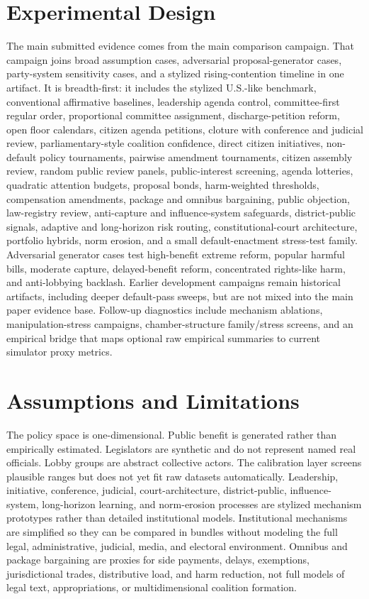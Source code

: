 \documentclass[manuscript,review,anonymous]{acmart}
\begin{document}
\section{Experimental Design}

The main submitted evidence comes from the main comparison campaign. That campaign joins broad assumption cases, adversarial proposal-generator cases, party-system sensitivity cases, and a stylized rising-contention timeline in one artifact. It is breadth-first: it includes the stylized U.S.-like benchmark, conventional affirmative baselines, leadership agenda control, committee-first regular order, proportional committee assignment, discharge-petition reform, open floor calendars, citizen agenda petitions, cloture with conference and judicial review, parliamentary-style coalition confidence, direct citizen initiatives, non-default policy tournaments, pairwise amendment tournaments, citizen assembly review, random public review panels, public-interest screening, agenda lotteries, quadratic attention budgets, proposal bonds, harm-weighted thresholds, compensation amendments, package and omnibus bargaining, public objection, law-registry review, anti-capture and influence-system safeguards, district-public signals, adaptive and long-horizon risk routing, constitutional-court architecture, portfolio hybrids, norm erosion, and a small default-enactment stress-test family. Adversarial generator cases test high-benefit extreme reform, popular harmful bills, moderate capture, delayed-benefit reform, concentrated rights-like harm, and anti-lobbying backlash. Earlier development campaigns remain historical artifacts, including deeper default-pass sweeps, but are not mixed into the main paper evidence base. Follow-up diagnostics include mechanism ablations, manipulation-stress campaigns, chamber-structure family/stress screens, and an empirical bridge that maps optional raw empirical summaries to current simulator proxy metrics.




\section{Assumptions and Limitations}

The policy space is one-dimensional. Public benefit is generated rather than empirically estimated. Legislators are synthetic and do not represent named real officials. Lobby groups are abstract collective actors. The calibration layer screens plausible ranges but does not yet fit raw datasets automatically. Leadership, initiative, conference, judicial, court-architecture, district-public, influence-system, long-horizon learning, and norm-erosion processes are stylized mechanism prototypes rather than detailed institutional models. Institutional mechanisms are simplified so they can be compared in bundles without modeling the full legal, administrative, judicial, media, and electoral environment. Omnibus and package bargaining are proxies for side payments, delays, exemptions, jurisdictional trades, distributive load, and harm reduction, not full models of legal text, appropriations, or multidimensional coalition formation.
\end{document}
